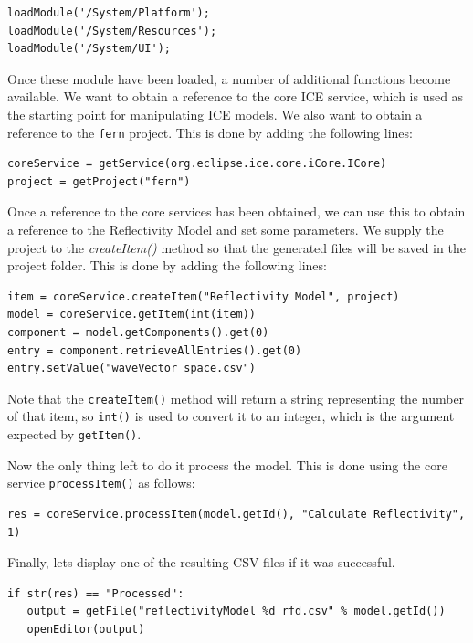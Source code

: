 \lstset{basicstyle=\ttfamily\small, breaklines}

{\small
\begin{verbatim}
loadModule('/System/Platform');
loadModule('/System/Resources');
loadModule('/System/UI');
\end{verbatim}
}

Once these module have been loaded, a number of additional functions become
available. We want to obtain a reference to the core ICE service, which is used
as the starting point for manipulating ICE models. We also want to obtain a
reference to the \texttt{fern} project. This is done by adding the following
lines:

{\small
\begin{verbatim}
coreService = getService(org.eclipse.ice.core.iCore.ICore)
project = getProject("fern")
\end{verbatim}
}

Once a reference to the core services has been obtained, we can use this to
obtain a reference to the Reflectivity Model and set some parameters. We supply
the project to the \textit{createItem()} method so that the generated files will
be saved in the project folder. This is done by adding the following lines:

{\small
\begin{verbatim}
item = coreService.createItem("Reflectivity Model", project)
model = coreService.getItem(int(item))
component = model.getComponents().get(0)
entry = component.retrieveAllEntries().get(0)
entry.setValue("waveVector_space.csv")
\end{verbatim}
}

Note that the \texttt{createItem()} method will return a string representing the
number of that item, so \texttt{int()} is used to convert it to an integer, which is the
argument expected by \texttt{getItem()}.

Now the only thing left to do it process the model. This is done using the core
service \texttt{processItem()} as follows:

{\small
\begin{verbatim}
res = coreService.processItem(model.getId(), "Calculate Reflectivity", 1)
\end{verbatim}
}

Finally, lets display one of the resulting CSV files if it was
successful.

{\small
\begin{verbatim}
if str(res) == "Processed":
   output = getFile("reflectivityModel_%d_rfd.csv" % model.getId()) 
   openEditor(output)
\end{verbatim}
}

